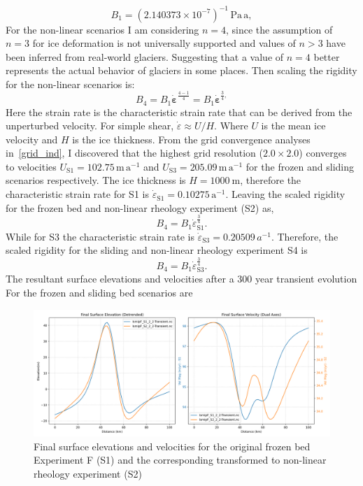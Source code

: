 \begin{equation}
B_{1} = (2.140373×10^{-7})^{-1}\,\mathrm{Pa\,a},
\end{equation}
For the non-linear scenarios I am considering $n=4$, since the assumption of $n = 3$ for ice deformation is not universally supported and values of $n > 3$ have been inferred from real‐world glaciers. Suggesting that a value of $n=4$ better represents the actual behavior of glaciers in some places\cite{Getraer_2025}. Then scaling the rigidity for the non-linear scenarios is:
\begin{equation}
B_4 = B_1 \mathbf{\dot{\varepsilon}}^{\frac{4-1}{4}} = B_1 \mathbf{\dot{\varepsilon}}^{\frac{3}{4},}
\end{equation}
Here the strain rate is the characteristic strain rate that can be derived from the unperturbed velocity. For simple shear, $\dot{\varepsilon} \approx U / H$. Where $U$ is the mean ice velocity and $H$ is the ice thickness. 
From the grid convergence analyses in~\ref{grid_ind}, I discovered that the highest grid resolution ($2.0\times2.0$) converges to velocities $U_{\mathrm{S1}}=102.75 \, \mathrm{m\,a^{-1}}$ and $U_{\mathrm{S3}}=205.09 \, \mathrm{m\,a^{-1}}$ for the frozen and sliding scenarios respectively. The ice thickness is $H=1000~\mathrm{m}$, therefore the characteristic strain rate for S1 is $\dot{\varepsilon}_{\mathrm{S1}}=  0.10275\,\mathrm{a^{-1}}$. Leaving the scaled rigidity for the frozen bed and non-linear rheology experiment (S2) as, 
\begin{equation}
B_4 = B_1 \dot{\varepsilon}_{\mathrm{S1}}^{\frac{3}{4}}.
\end{equation}
While for S3 the characteristic strain rate is $\dot{\varepsilon}_{\mathrm{S3}}= 0.20509 \, a^{-1}.$ Therefore, the scaled rigidity for the sliding and non-linear rheology experiment S4 is
\begin{equation}
B_4 = B_1 \dot{\varepsilon}_{\mathrm{S3}}^{\frac{3}{4}}.
\end{equation}
The resultant surface elevations and velocities after a 300 year transient evolution For the frozen and sliding bed scenarios are 
\begin{figure}[H]
    \includegraphics[scale=0.40]{combined_elevation_detrended_surface_velocity_['S1']_['S2'].png}
    \caption{Final surface elevations and velocities for the original frozen bed Experiment F (S1) and the corresponding transformed to non-linear rheology experiment (S2)}
    \label{fig:elev_vel_S1_S2}
\end{figure}
